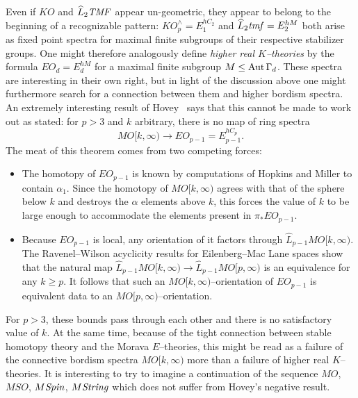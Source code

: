 Even if \(KO\) and \(\widehat L_2 \mathit{TMF}\) appear un-geometric, they appear to belong to the beginning of a recognizable pattern: \(KO^\wedge_p = E_1^{hC_2}\) and \(\widehat L_2 \mathit{tmf} = E_2^{hM}\) both arise as fixed point spectra for maximal finite subgroups of their respective stabilizer groups.  One might therefore analogously define \textit{higher real \(K\)--theories} by the formula \(EO_d = E_d^{hM}\) for a maximal finite subgroup \(M \le \operatorname{Aut} \Gamma_d\).  These spectra are interesting in their own right, but in light of the discussion above one might furthermore search for a connection between them and higher bordism spectra.  An extremely interesting result of Hovey~\cite[Proposition 2.3.4]{HoveyVnEltsOfRings} says that this cannot be made to work out as stated: for \(p > 3\) and \(k\) arbitrary, there is no map of ring spectra \[MO[k, \infty) \to EO_{p-1} = E_{p-1}^{hC_p}.\]  The meat of this theorem comes from two competing forces:
\begin{itemize}
    \item The homotopy of \(EO_{p-1}\) is known by computations of Hopkins and Miller to contain \(\alpha_1\).  Since the homotopy of \(MO[k, \infty)\) agrees with that of the sphere below \(k\) and destroys the \(\alpha\) elements above \(k\), this forces the value of \(k\) to be large enough to accommodate the elements present in \(\pi_* EO_{p-1}\).
    \item Because \(EO_{p-1}\) is local, any orientation of it factors through \(\widehat L_{p-1} MO[k, \infty)\).  The Ravenel--Wilson acyclicity results for Eilenberg--Mac Lane spaces show that the natural map \(\widehat L_{p-1} MO[k, \infty) \to \widehat L_{p-1} MO[p, \infty)\) is an equivalence for any \(k \ge p\).  It follows that such an \(MO[k, \infty)\)--orientation of \(EO_{p-1}\) is equivalent data to an \(MO[p, \infty)\)--orientation.
\end{itemize}
For \(p > 3\), these bounds pass through each other and there is no satisfactory value of \(k\).  At the same time, because of the tight connection between stable homotopy theory and the Morava \(E\)--theories, this might be read as a failure of the connective bordism spectra \(MO[k, \infty)\) more than a failure of higher real \(K\)--theories.  It is interesting to try to imagine a continuation of the sequence \(MO\), \(MSO\), \(M\mathit{Spin}\), \(M\mathit{String}\) which does not suffer from Hovey's negative result.

